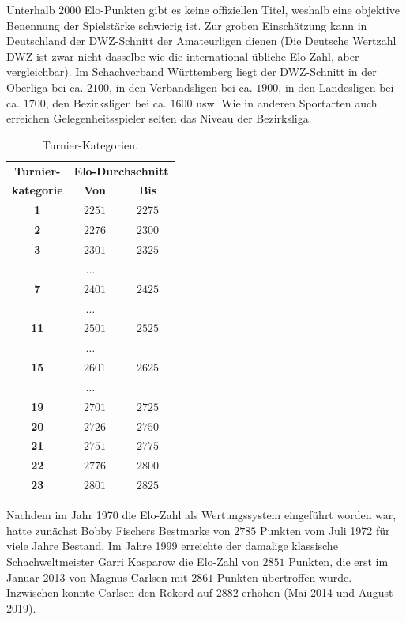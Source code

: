 Unterhalb $2000$ Elo-Punkten gibt es keine offiziellen Titel, weshalb eine objektive Benennung der Spielstärke schwierig ist. Zur groben Einschätzung kann in Deutschland der DWZ-Schnitt der Amateurligen dienen (Die Deutsche Wertzahl DWZ ist zwar nicht dasselbe wie die international übliche Elo-Zahl, aber vergleichbar). Im Schachverband Württemberg liegt der DWZ-Schnitt in der Oberliga bei ca. $2100$, in den Verbandsligen bei ca. $1900$, in den Landesligen bei ca. $1700$, den Bezirksligen bei ca. $1600$ usw. Wie in anderen Sportarten auch erreichen Gelegenheitsspieler selten das Niveau der Bezirksliga.

\begin{table}
    \centering
    \begin{tabular}{c c c}
        \toprule
        \textbf{Turnier-} & \multicolumn{2}{c}{\textbf{Elo-Durchschnitt}} \\
        \textbf{kategorie} & \textbf{Von} & \textbf{Bis} \\
        \midrule
        \textbf{1} & $2251$ & $2275$ \\
        \textbf{2} & $2276$ & $2300$ \\
        \textbf{3} & $2301$ & $2325$ \\
        \multicolumn{3}{c}{$\dots$} \\
        \textbf{7} & $2401$ & $2425$ \\
        \multicolumn{3}{c}{$\dots$} \\
        \textbf{11} & $2501$ & $2525$ \\
        \multicolumn{3}{c}{$\dots$} \\
        \textbf{15} & $2601$ & $2625$ \\
        \multicolumn{3}{c}{$\dots$} \\
        \textbf{19} & $2701$ & $2725$ \\
        \textbf{20} & $2726$ & $2750$ \\
        \textbf{21} & $2751$ & $2775$ \\
        \textbf{22} & $2776$ & $2800$ \\
        \textbf{23} & $2801$ & $2825$ \\
        \bottomrule
    \end{tabular}
    \caption{Turnier-Kategorien.}
    \label{tab:turnier-kategorien}
\end{table}

Nachdem im Jahr 1970 die Elo-Zahl als Wertungssystem eingeführt worden war, hatte zunächst Bobby Fischers Bestmarke von $2785$ Punkten vom Juli 1972 für viele Jahre Bestand. Im Jahre 1999 erreichte der damalige klassische Schachweltmeister Garri Kasparow die Elo-Zahl von $2851$ Punkten, die erst im Januar 2013 von Magnus Carlsen mit $2861$ Punkten übertroffen wurde. Inzwischen konnte Carlsen den Rekord auf $2882$ erhöhen (Mai 2014 und August 2019).

